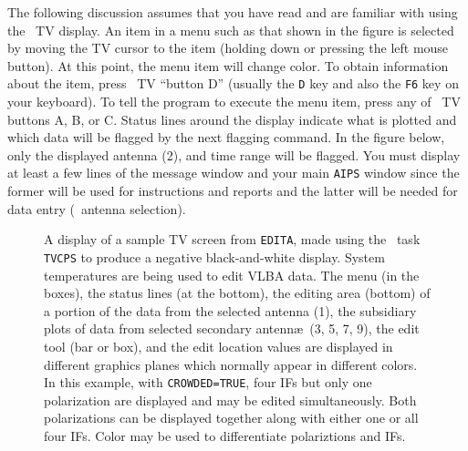 The following discussion assumes that you have read  and are
familiar with using the \AIPS\ TV display.  An item in a menu such as
that shown in the figure is selected by moving the TV cursor to the
item (holding down or pressing the left mouse button).  At this point,
the menu item will change color.  To obtain information about the
item, press \AIPS\ TV ``button D'' (usually the {\tt D} key and also
the {\tt F6} key on your keyboard).  To tell the program to execute
the menu item, press any of \AIPS\ TV buttons A, B, or \hbox{C}.
Status lines around the display indicate what is plotted and which
data will be flagged by the next flagging command.  In the figure
below, only the displayed antenna (2), and time range will be flagged.
You must display at least a few lines of the message window and your
main {\tt AIPS} window since the former will be used for instructions
and reports and the latter will be needed for data entry (\eg\ antenna
selection).

\begin{figure}
\centering
\caption[{\tt EDITA} display]{A display of a sample TV screen from
\hbox{{\tt EDITA}}, made using the \AIPS\ task {\tt TVCPS} to produce
a negative black-and-white display.  System temperatures are being
used to edit VLBA data.  The {\tt {}} menu (in the boxes),
the status lines (at the bottom), the editing area (bottom) of a
portion of the data from the selected antenna (1), the subsidiary
plots of data from selected secondary antenn\ae\ (3, 5, 7, 9), the
edit tool (bar or box), and the edit location values are displayed in
different graphics planes which normally appear in different colors.
In this example, with {\tt CROWDED=TRUE}, four IFs but only one
polarization are displayed and may be edited simultaneously.  Both
polarizations can be displayed together along with either one or all
four IFs.  Color may be used to differentiate polariztions and IFs.
}
\label{fig:edita}
\end{figure}

